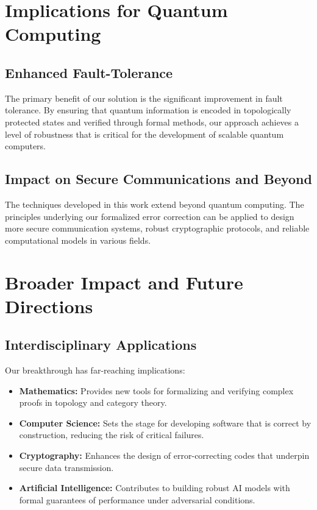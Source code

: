 \documentclass[12pt]{article}
\begin{document}
\section{Implications for Quantum Computing}
\subsection{Enhanced Fault-Tolerance}
The primary benefit of our solution is the significant improvement in fault tolerance. By ensuring that quantum information is encoded in topologically protected states and verified through formal methods, our approach achieves a level of robustness that is critical for the development of scalable quantum computers.

\subsection{Impact on Secure Communications and Beyond}
The techniques developed in this work extend beyond quantum computing. The principles underlying our formalized error correction can be applied to design more secure communication systems, robust cryptographic protocols, and reliable computational models in various fields.

\section{Broader Impact and Future Directions}
\subsection{Interdisciplinary Applications}
Our breakthrough has far-reaching implications:
\begin{itemize}[label=\textbullet]
    \item \textbf{Mathematics:} Provides new tools for formalizing and verifying complex proofs in topology and category theory.
    \item \textbf{Computer Science:} Sets the stage for developing software that is correct by construction, reducing the risk of critical failures.
    \item \textbf{Cryptography:} Enhances the design of error-correcting codes that underpin secure data transmission.
    \item \textbf{Artificial Intelligence:} Contributes to building robust AI models with formal guarantees of performance under adversarial conditions.
\end{itemize}
\end{document}
